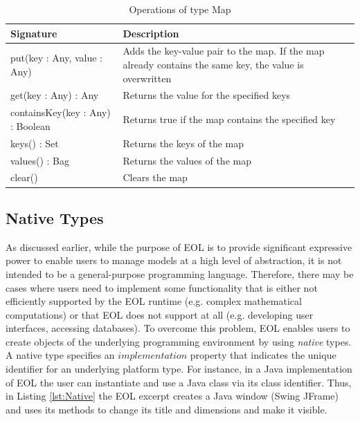 \begin{longtable} {|p{5.5cm}|p{6.5cm}|}
			
			\caption{Operations of type Map}
			\label{tab:MapOperations}\\
			
			\hline
			
			\textbf{Signature} & \textbf{Description} \\\hline

			put(key : Any, value : Any) & Adds the key-value pair to the map. If the map already contains the same key, the value is overwritten\\\hline
				
			get(key : Any) : Any & Returns the value for the specified keys\\\hline
	
			containsKey(key : Any) : Boolean & Returns true if the map contains the specified key\\\hline
	
			keys() : Set & Returns the keys of the map\\\hline
			
			values() : Bag & Returns the values of the map\\\hline
			
			clear() & Clears the map\\\hline
			
\end{longtable}

\subsection{Native Types}

As discussed earlier, while the purpose of EOL is to provide significant expressive power to enable users to manage models at a high level of abstraction, it is not intended to be a general-purpose programming language. Therefore, there may be cases where users need to implement some functionality that is either not efficiently supported by the EOL runtime (e.g. complex mathematical computations) or that EOL does not support at all (e.g. developing user interfaces, accessing databases). To overcome this problem, EOL enables users to create objects of the underlying programming environment by using \emph{native} types. A native type specifies an $implementation$ property that indicates the unique identifier for an underlying platform type. For instance, in a Java implementation of EOL the user can instantiate and use a Java class via its class identifier. Thus, in Listing \ref{lst:Native} the EOL excerpt creates a Java window (Swing JFrame) and uses its methods to change its title and dimensions and make it visible.

